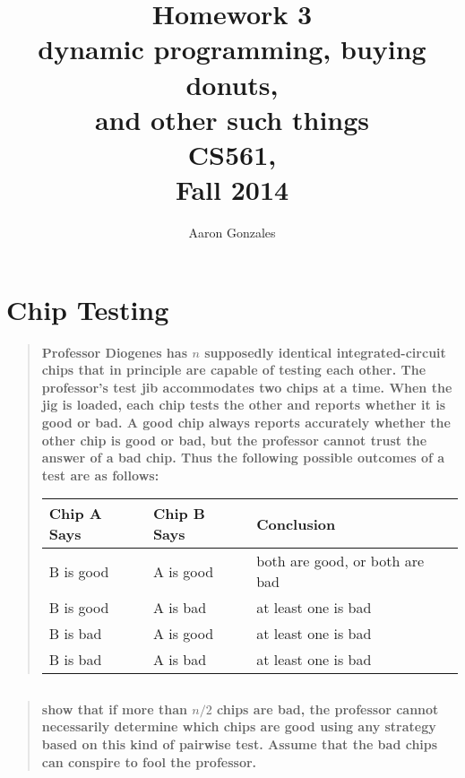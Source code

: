 \documentclass[titlepage]{article}\usepackage[]{graphicx}\usepackage[]{color}
\begin{document}
\title{Homework 3 \\ dynamic programming, buying donuts, \\ and other such
things\\  CS561, \\ Fall 2014}
\author{Aaron Gonzales}
\maketitle


\section{Chip Testing }

\begin{quote}
\textbf{Professor Diogenes has $n$ supposedly identical integrated-circuit chips that
in principle are capable of testing each other. The professor's test jib
accommodates two chips at a time. When the jig is loaded, each chip tests the
other and reports whether it is good or bad. A good chip always reports
accurately whether the other chip is good or bad, but the professor cannot
trust the answer of a bad chip. Thus the following possible outcomes of a test
are as follows:}

\begin{table}[h]
\centering
  \begin{tabular}{lll}
	\hline
	\multicolumn{1}{|l|}{Chip A Says} & \multicolumn{1}{l|}{Chip B Says} & \multicolumn{1}{l|}{Conclusion} \\ \hline
	B is good                         & A is good                        & both are good, or both are bad  \\ \hline
	B is good                         & A is bad                         & at least one is bad             \\ \hline
	B is bad                          & A is good                        & at least one is bad             \\ \hline
	B is bad                          & A is bad                         & at least one is bad             \\ \hline
	\end{tabular}
  \end{table}

\end{quote}


\subsection{}
  \begin{quote}
\textbf{show that if more than $n/2$ chips are bad, the professor cannot
	necessarily determine which chips are good using any strategy based on this
	kind of pairwise test. Assume that the bad chips can conspire to fool the
	professor. }
  \end{quote}
\end{document}
